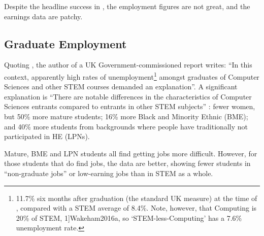 \documentclass[sigconf]{acmart}
\begin{document}
Despite the headline success in \cite{BIS2011a}, the employment
figures are not great, and the earnings data are patchy.

\subsection{Graduate Employment}

Quoting \cite{UKCES2015b}, the author of a UK Government-commissioned
report \cite{Shadbolt2016a} writes: ``In this context,
apparently high rates of unemployment\footnote{11.7\% six months after
graduation (the standard UK measure) at the time of
\cite{Shadbolt2016a}, compared with a STEM average of 8.4\%. Note,
however, that Computing is 20\% of STEM, %
1]{Wakeham2016a}, so `STEM-less-Computing' has a 7.6\% unemployment
rate.} amongst graduates of Computer Sciences and other STEM courses
demanded an explanation''. A significant explanation is ``There are
notable differences in the characteristics of Computer Sciences
entrants compared to entrants in other STEM subjects''
\cite[\P2.6]{Shadbolt2016a}: fewer women, but 50\% more mature
students; 16\% more Black and Minority Ethnic (BME); and 40\% more
students from backgrounds where people have traditionally not
participated in HE (LPNs).

Mature, BME and LPN students all find getting jobs more difficult.
However, for those students that do find jobs, the data are
better, showing \cite[Figure 6]{Shadbolt2016a} fewer students in
``non-graduate jobs'' or low-earning jobs than in STEM as a whole.


\end{document}
